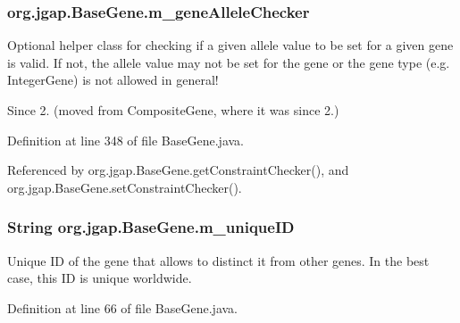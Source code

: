 \hypertarget{classorg_1_1jgap_1_1_base_gene_a846344a347601679d0935dcdba7f7e6f}{
\subsubsection[{m\-\_\-gene\-Allele\-Checker}]{ org.\-jgap.\-Base\-Gene.\-m\-\_\-gene\-Allele\-Checker\hspace{0.3cm}{\ttfamily [private]}}}\label{classorg_1_1jgap_1_1_base_gene_a846344a347601679d0935dcdba7f7e6f}
Optional helper class for checking if a given allele value to be set for a given gene is valid. If not, the allele value may not be set for the gene or the gene type (e.\-g. Integer\-Gene) is not allowed in general!

\begin{DoxySince}{Since}
2. (moved from Composite\-Gene, where it was since 2.) 
\end{DoxySince}


Definition at line 348 of file Base\-Gene.\-java.



Referenced by org.\-jgap.\-Base\-Gene.\-get\-Constraint\-Checker(), and org.\-jgap.\-Base\-Gene.\-set\-Constraint\-Checker().

\hypertarget{classorg_1_1jgap_1_1_base_gene_a8cd57f3a57f5a892f590df9e06b82e47}{
\subsubsection[{m\-\_\-unique\-I\-D}]{\setlength{\rightskip}{0pt plus 5cm}String org.\-jgap.\-Base\-Gene.\-m\-\_\-unique\-I\-D\hspace{0.3cm}{\ttfamily [private]}}}\label{classorg_1_1jgap_1_1_base_gene_a8cd57f3a57f5a892f590df9e06b82e47}
Unique I\-D of the gene that allows to distinct it from other genes. In the best case, this I\-D is unique worldwide. 

Definition at line 66 of file Base\-Gene.\-java.



